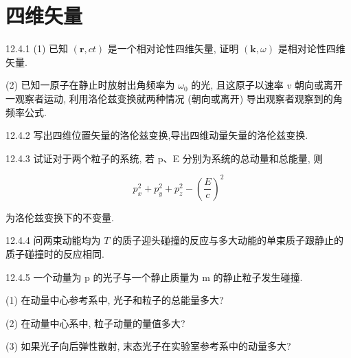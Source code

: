 \section{四维矢量}

\begin{problem}{12.4.1}
(1) 已知 $(\bm{r},ct)$ 是一个相对论性四维矢量, 证明 $(\bm{k},\omega)$ 是相对论性四维矢量.

(2) 已知一原子在静止时放射出角频率为 $\omega_0$ 的光, 且这原子以速率 $v$ 朝向或离开一观察者运动, 利用洛伦兹变换就两种情况 (朝向或离开) 导出观察者观察到的角频率公式.
\end{problem}
\clearpage


\begin{problem}{12.4.2}
写出四维位置矢量的洛伦兹变换,导出四维动量矢量的洛伦兹变换.
\end{problem}
\clearpage


\begin{problem}{12.4.3}
试证对于两个粒子的系统, 若 p、E 分别为系统的总动量和总能量, 则

\[
p _ {x} ^ {2} + p _ {y} ^ {2} + p _ {z} ^ {2} - \left(\frac {E}{c}\right) ^ {2}
\]

为洛伦兹变换下的不变量.
\end{problem}
\clearpage


\begin{problem}{12.4.4}
问两束动能均为 $T$ 的质子迎头碰撞的反应与多大动能的单束质子跟静止的质子碰撞时的反应相同.
\end{problem}
\clearpage


\begin{problem}{12.4.5}
一个动量为 p 的光子与一个静止质量为 m 的静止粒子发生碰撞.

(1) 在动量中心参考系中, 光子和粒子的总能量多大?

(2) 在动量中心系中, 粒子动量的量值多大?

(3) 如果光子向后弹性散射, 末态光子在实验室参考系中的动量多大?
\end{problem}
\clearpage


